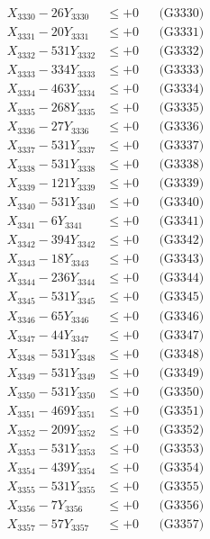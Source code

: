 \documentclass[a4paper,10pt]{article}
\begin{document}
{\begin{align}
X_{3330} - 26Y_{3330} &\leq +0 && \text{(G3330)} \\
\allowbreak
X_{3331} - 20Y_{3331} &\leq +0 && \text{(G3331)} \\
X_{3332} - 531Y_{3332} &\leq +0 && \text{(G3332)} \\
X_{3333} - 334Y_{3333} &\leq +0 && \text{(G3333)} \\
X_{3334} - 463Y_{3334} &\leq +0 && \text{(G3334)} \\
X_{3335} - 268Y_{3335} &\leq +0 && \text{(G3335)} \\
X_{3336} - 27Y_{3336} &\leq +0 && \text{(G3336)} \\
X_{3337} - 531Y_{3337} &\leq +0 && \text{(G3337)} \\
X_{3338} - 531Y_{3338} &\leq +0 && \text{(G3338)} \\
X_{3339} - 121Y_{3339} &\leq +0 && \text{(G3339)} \\
X_{3340} - 531Y_{3340} &\leq +0 && \text{(G3340)} \\
\allowbreak
X_{3341} - 6Y_{3341} &\leq +0 && \text{(G3341)} \\
X_{3342} - 394Y_{3342} &\leq +0 && \text{(G3342)} \\
X_{3343} - 18Y_{3343} &\leq +0 && \text{(G3343)} \\
X_{3344} - 236Y_{3344} &\leq +0 && \text{(G3344)} \\
X_{3345} - 531Y_{3345} &\leq +0 && \text{(G3345)} \\
X_{3346} - 65Y_{3346} &\leq +0 && \text{(G3346)} \\
X_{3347} - 44Y_{3347} &\leq +0 && \text{(G3347)} \\
X_{3348} - 531Y_{3348} &\leq +0 && \text{(G3348)} \\
X_{3349} - 531Y_{3349} &\leq +0 && \text{(G3349)} \\
X_{3350} - 531Y_{3350} &\leq +0 && \text{(G3350)} \\
\allowbreak
X_{3351} - 469Y_{3351} &\leq +0 && \text{(G3351)} \\
X_{3352} - 209Y_{3352} &\leq +0 && \text{(G3352)} \\
X_{3353} - 531Y_{3353} &\leq +0 && \text{(G3353)} \\
X_{3354} - 439Y_{3354} &\leq +0 && \text{(G3354)} \\
X_{3355} - 531Y_{3355} &\leq +0 && \text{(G3355)} \\
X_{3356} - 7Y_{3356} &\leq +0 && \text{(G3356)} \\
X_{3357} - 57Y_{3357} &\leq +0 && \text{(G3357)} \\

\end{align}}
\end{document}
